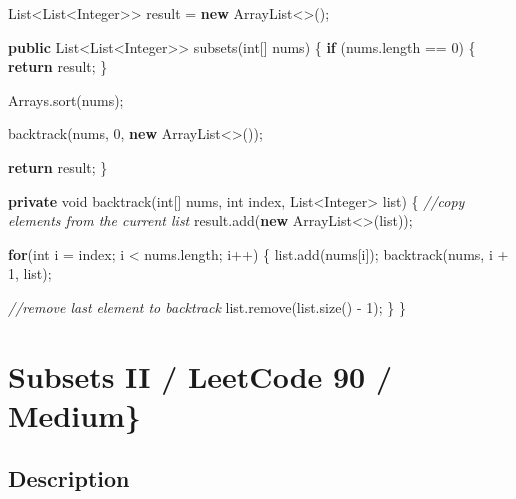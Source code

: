 \documentclass[]{book}
\newenvironment{Shaded}{\begin{snugshade}}{\end{snugshade}}
\newcommand{\BuiltInTok}[1]{#1}
\newcommand{\CommentTok}[1]{\textcolor[rgb]{0.56,0.35,0.01}{\textit{#1}}}
\newcommand{\DataTypeTok}[1]{\textcolor[rgb]{0.13,0.29,0.53}{#1}}
\newcommand{\DecValTok}[1]{\textcolor[rgb]{0.00,0.00,0.81}{#1}}
\newcommand{\FunctionTok}[1]{\textcolor[rgb]{0.00,0.00,0.00}{#1}}
\newcommand{\KeywordTok}[1]{\textcolor[rgb]{0.13,0.29,0.53}{\textbf{#1}}}
\newcommand{\NormalTok}[1]{#1}
\begin{document}
\begin{Shaded}
\begin{Highlighting}[]
\BuiltInTok{List}\NormalTok{<}\BuiltInTok{List}\NormalTok{<}\BuiltInTok{Integer}\NormalTok{>> result = }\KeywordTok{new} \BuiltInTok{ArrayList}\NormalTok{<>();}

\KeywordTok{public} \BuiltInTok{List}\NormalTok{<}\BuiltInTok{List}\NormalTok{<}\BuiltInTok{Integer}\NormalTok{>> }\FunctionTok{subsets}\NormalTok{(}\DataTypeTok{int}\NormalTok{[] nums) \{}
    \KeywordTok{if}\NormalTok{ (nums.}\FunctionTok{length}\NormalTok{ == }\DecValTok{0}\NormalTok{) \{}
        \KeywordTok{return}\NormalTok{ result;}
\NormalTok{    \}}

    \BuiltInTok{Arrays}\NormalTok{.}\FunctionTok{sort}\NormalTok{(nums);}

    \FunctionTok{backtrack}\NormalTok{(nums, }\DecValTok{0}\NormalTok{, }\KeywordTok{new} \BuiltInTok{ArrayList}\NormalTok{<>());}

    \KeywordTok{return}\NormalTok{ result;}
\NormalTok{\}}

\KeywordTok{private} \DataTypeTok{void} \FunctionTok{backtrack}\NormalTok{(}\DataTypeTok{int}\NormalTok{[] nums, }\DataTypeTok{int}\NormalTok{ index, }\BuiltInTok{List}\NormalTok{<}\BuiltInTok{Integer}\NormalTok{> list) \{}
    \CommentTok{//copy elements from the current list}
\NormalTok{    result.}\FunctionTok{add}\NormalTok{(}\KeywordTok{new} \BuiltInTok{ArrayList}\NormalTok{<>(list));}

    \KeywordTok{for}\NormalTok{(}\DataTypeTok{int}\NormalTok{ i = index; i < nums.}\FunctionTok{length}\NormalTok{; i++) \{}
\NormalTok{        list.}\FunctionTok{add}\NormalTok{(nums[i]);}
        \FunctionTok{backtrack}\NormalTok{(nums, i + }\DecValTok{1}\NormalTok{, list);}

        \CommentTok{//remove last element to backtrack}
\NormalTok{        list.}\FunctionTok{remove}\NormalTok{(list.}\FunctionTok{size}\NormalTok{() - }\DecValTok{1}\NormalTok{);}
\NormalTok{    \}}
\NormalTok{\}}
\end{Highlighting}
\end{Shaded}

\hypertarget{subsets-ii-leetcode-90-medium}{%
\section{Subsets II / LeetCode 90 / Medium\}}\label{subsets-ii-leetcode-90-medium}}

\hypertarget{description-16}{%
\subsection{Description}\label{description-16}}
\end{document}
